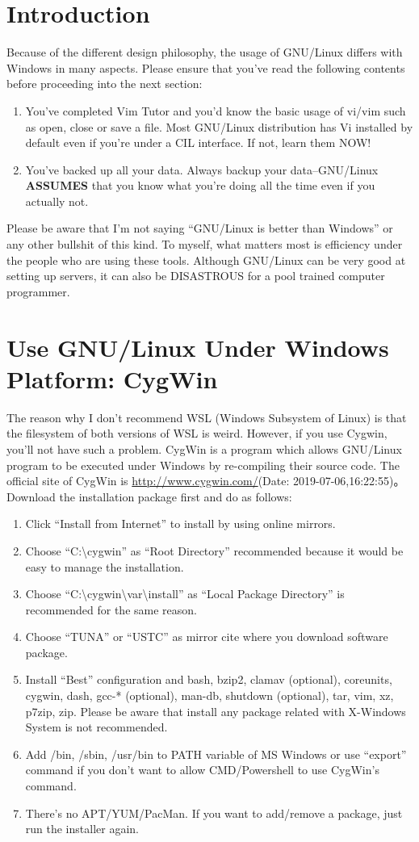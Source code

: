 \chapter{Introduction}
Because of the different design philosophy, the usage of GNU/Linux differs with Windows in many aspects. Please ensure that you've read the following contents before proceeding into the next section:
\begin{enumerate}
	\item You've completed Vim Tutor and you'd know the basic usage of vi/vim such as open, close or save a file. Most GNU/Linux distribution has Vi installed by default even if you're under a CIL interface. If not, learn them NOW!
	\item You've backed up all your data. Always backup your data--GNU/Linux \textbf{ASSUMES} that you know what you're doing all the time even if you actually not.
\end{enumerate}
Please be aware that I'm not saying ``GNU/Linux is better than Windows'' or any other bullshit of this kind. To myself, what matters most is efficiency under the people who are using these tools. Although GNU/Linux can be very good at setting up servers, it can also be DISASTROUS for a pool trained computer programmer.
\chapter{Use GNU/Linux Under Windows Platform: CygWin}
The reason why I don't recommend WSL (Windows Subsystem of Linux) is that the filesystem of both versions of WSL is weird. However, if you use Cygwin, you'll not have such a problem. CygWin is a program which allows GNU/Linux program to be executed under Windows by re-compiling their source code. The official site of CygWin is \url{http://www.cygwin.com/}(Date: 2019-07-06,16:22:55)。Download the installation package first and do as follows:
\begin{enumerate}
	\item Click ``Install from Internet'' to install by using online mirrors.
	\item Choose ``C:\textbackslash cygwin'' as ``Root  Directory'' recommended because it would be easy to manage the installation.
	\item Choose  ``C:\textbackslash cygwin\textbackslash var\textbackslash install'' as ``Local Package Directory'' is recommended for the same reason.
	\item Choose ``TUNA'' or ``USTC'' as mirror cite where you download software package.
	\item Install ``Best'' configuration and bash, bzip2, clamav (optional), coreunits, cygwin, dash, gcc-* (optional), man-db, shutdown (optional), tar, vim, xz, p7zip, zip. Please be aware that install any package related with X-Windows System is not recommended.
	\item Add /bin, /sbin, /usr/bin to PATH variable of MS Windows or use ``export'' command if you don't want to allow CMD/Powershell to use CygWin's command.
	\item There's no APT/YUM/PacMan. If you want to add/remove a package, just run the installer again.
\end{enumerate}
